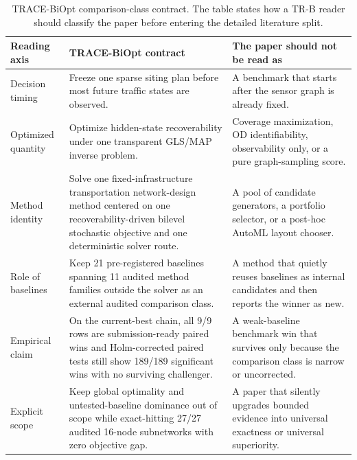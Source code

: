 \begin{table}[pos=htbp]
\centering
\caption{TRACE-BiOpt comparison-class contract. The table states how a TR-B reader should classify the paper before entering the detailed literature split.}
\label{tab:trace-biopt-comparison-class-contract}
\small
\begin{tabularx}{\textwidth}{>{\raggedright\arraybackslash}p{}>{\raggedright\arraybackslash}p{}>{\raggedright\arraybackslash}X}
\toprule
Reading axis & TRACE-BiOpt contract & The paper should not be read as \\
\midrule
Decision timing & Freeze one sparse siting plan before most future traffic states are observed. & A benchmark that starts after the sensor graph is already fixed. \\
Optimized quantity & Optimize hidden-state recoverability under one transparent GLS/MAP inverse problem. & Coverage maximization, OD identifiability, observability only, or a pure graph-sampling score. \\
Method identity & Solve one fixed-infrastructure transportation network-design method centered on one recoverability-driven bilevel stochastic objective and one deterministic solver route. & A pool of candidate generators, a portfolio selector, or a post-hoc AutoML layout chooser. \\
Role of baselines & Keep 21 pre-registered baselines spanning 11 audited method families outside the solver as an external audited comparison class. & A method that quietly reuses baselines as internal candidates and then reports the winner as new. \\
Empirical claim & On the current-best chain, all 9/9 rows are submission-ready paired wins and Holm-corrected paired tests still show 189/189 significant wins with no surviving challenger. & A weak-baseline benchmark win that survives only because the comparison class is narrow or uncorrected. \\
Explicit scope & Keep global optimality and untested-baseline dominance out of scope while exact-hitting 27/27 audited 16-node subnetworks with zero objective gap. & A paper that silently upgrades bounded evidence into universal exactness or universal superiority. \\
\bottomrule
\end{tabularx}
\end{table}
